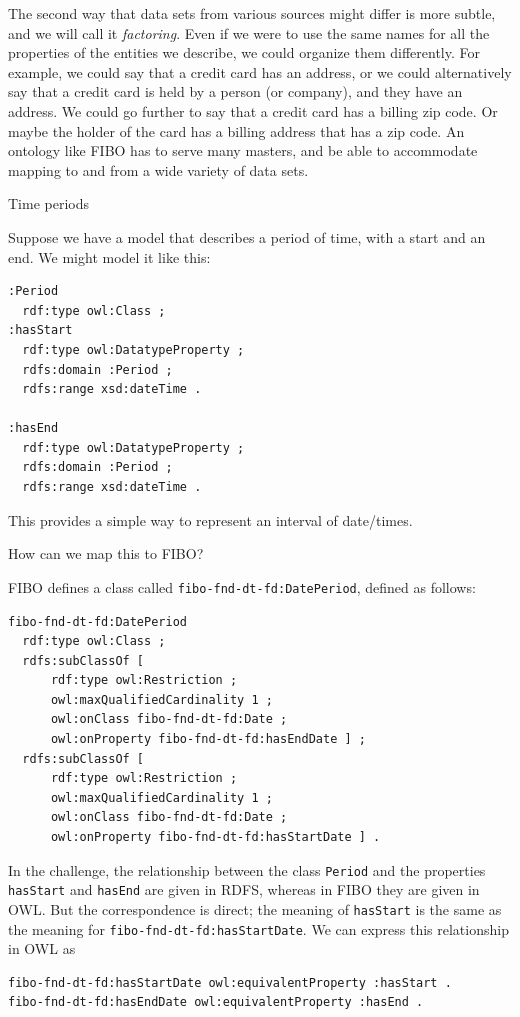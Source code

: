 The second way that data sets from various sources might differ 
is more subtle, and we will call it \emph{factoring}.  
Even if we were to use the same names for all
the properties of the entities we describe, we could organize 
them differently.  For example, we could say that a credit card has
an address, or we could alternatively say that a credit card is 
held by a person (or company), and they have an address.  We could go further 
to say that a credit card has a billing zip code.  Or maybe the holder of 
the card has a billing address that has a zip code. 
An ontology like FIBO has to serve many masters, 
and be able to accommodate mapping to and from a wide variety of data sets. 

\begin{challenge}{Time periods}

Suppose we have a model that describes a period of time, 
with a start and an end.  We might model it like this: 

\begin{lstlisting}
:Period
  rdf:type owl:Class ;
:hasStart
  rdf:type owl:DatatypeProperty ;
  rdfs:domain :Period ;
  rdfs:range xsd:dateTime .
 
:hasEnd
  rdf:type owl:DatatypeProperty ;
  rdfs:domain :Period ;
  rdfs:range xsd:dateTime .
\end{lstlisting}

This provides a simple way to represent an interval of date/times. 

How can we map this to FIBO? 

\solution

FIBO defines a class called \texttt{fibo-fnd-dt-fd:DatePeriod}, defined as follows:

\begin{lstlisting}
fibo-fnd-dt-fd:DatePeriod
  rdf:type owl:Class ;
  rdfs:subClassOf [
      rdf:type owl:Restriction ;
      owl:maxQualifiedCardinality 1 ;
      owl:onClass fibo-fnd-dt-fd:Date ;
      owl:onProperty fibo-fnd-dt-fd:hasEndDate ] ;
  rdfs:subClassOf [
      rdf:type owl:Restriction ;
      owl:maxQualifiedCardinality 1 ;
      owl:onClass fibo-fnd-dt-fd:Date ;
      owl:onProperty fibo-fnd-dt-fd:hasStartDate ] .
\end{lstlisting}

In the challenge, the relationship between the class \texttt{Period} 
and the properties \texttt{hasStart} and \texttt{hasEnd} are 
given in RDFS, whereas in FIBO they are given in OWL.  
But the correspondence is direct; the meaning of \texttt{hasStart} 
is the same as 
the meaning for \texttt{fibo-fnd-dt-fd:hasStartDate}.  We can 
express this relationship in OWL as 

\begin{lstlisting}
fibo-fnd-dt-fd:hasStartDate owl:equivalentProperty :hasStart .
fibo-fnd-dt-fd:hasEndDate owl:equivalentProperty :hasEnd .
\end{lstlisting}
\end{challenge}


